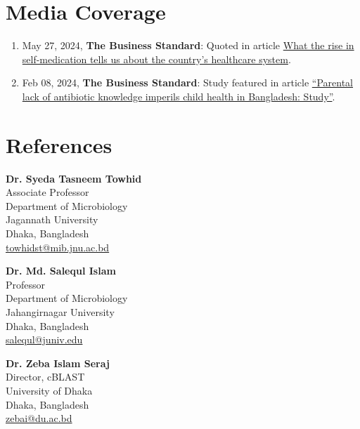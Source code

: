 \documentclass[
  11pt,
  letterpaper,
  DIV=11,
  numbers=noendperiod]{scrartcl}
\providecommand{\tightlist}{%
  \setlength{\itemsep}{0pt}\setlength{\parskip}{0pt}}
\begin{document}
\section{Media Coverage}\label{media-coverage}

\apptocmd{\tightlist}{\setlength{\itemsep}{2pt}}{}{}

\begin{enumerate}
\def\labelenumi{\arabic{enumi}.}
\tightlist
\item
  May 27, 2024, \textbf{The Business Standard}: Quoted in article
  \href{https://www.tbsnews.net/features/panorama/what-rise-self-medication-tells-us-about-countrys-healthcare-system-861146}{What
  the rise in self-medication tells us about the country's healthcare
  system}.
\item
  Feb 08, 2024, \textbf{The Business Standard}: Study featured in
  article
  \href{https://www.tbsnews.net/bangladesh/health/parental-lack-antibiotic-knowledge-imperils-child-health-bangladesh-study-789250}{``Parental
  lack of antibiotic knowledge imperils child health in Bangladesh:
  Study''}.
\end{enumerate}

\section{References}\label{references}

\noindent

\begin{minipage}[t]{0.32\linewidth}
\textbf{Dr. Syeda Tasneem Towhid} \\
Associate Professor \\
Department of Microbiology \\
Jagannath University \\
Dhaka, Bangladesh \\
\href{mailto:towhidst@mib.jnu.ac.bd}{towhidst@mib.jnu.ac.bd}
\end{minipage}
\hfill
\begin{minipage}[t]{0.32\linewidth}
\textbf{Dr. Md. Salequl Islam} \\
Professor \\
Department of Microbiology \\
Jahangirnagar University \\
Dhaka, Bangladesh \\
\href{mailto:salequl@juniv.edu}{salequl@juniv.edu}
\end{minipage}
\hfill
\begin{minipage}[t]{0.32\linewidth}
\textbf{Dr. Zeba Islam Seraj} \\
Director, cBLAST \\
University of Dhaka \\
Dhaka, Bangladesh \\
\href{mailto:zebai@du.ac.bd}{zebai@du.ac.bd}
\end{minipage}
\end{document}
